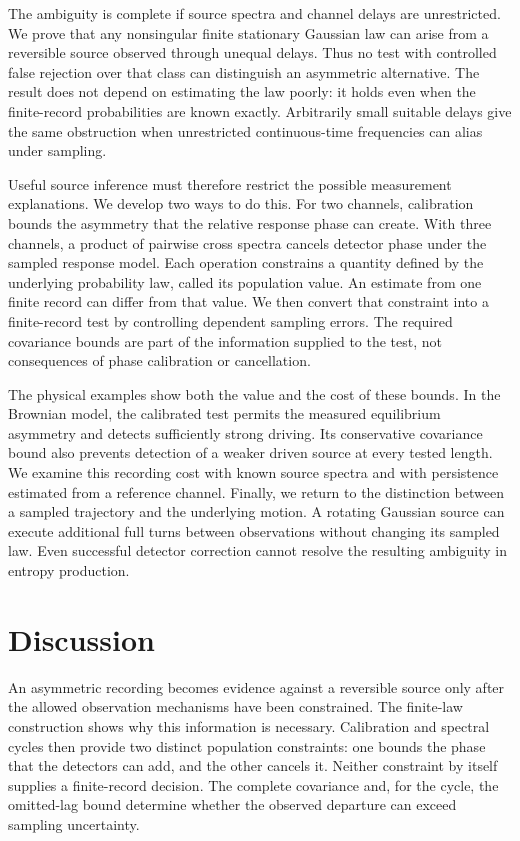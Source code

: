 \documentclass[aps,pre,reprint,floatfix,superscriptaddress,nofootinbib]{revtex4-2}
\begin{document}
The ambiguity is complete if source spectra and channel delays are unrestricted. We prove that any nonsingular finite stationary Gaussian law can arise from a reversible source observed through unequal delays. Thus no test with controlled false rejection over that class can distinguish an asymmetric alternative. The result does not depend on estimating the law poorly: it holds even when the finite-record probabilities are known exactly. Arbitrarily small suitable delays give the same obstruction when unrestricted continuous-time frequencies can alias under sampling.

Useful source inference must therefore restrict the possible measurement explanations. We develop two ways to do this. For two channels, calibration bounds the asymmetry that the relative response phase can create. With three channels, a product of pairwise cross spectra cancels detector phase under the sampled response model. Each operation constrains a quantity defined by the underlying probability law, called its population value. An estimate from one finite record can differ from that value. We then convert that constraint into a finite-record test by controlling dependent sampling errors. The required covariance bounds are part of the information supplied to the test, not consequences of phase calibration or cancellation.

The physical examples show both the value and the cost of these bounds. In the Brownian model, the calibrated test permits the measured equilibrium asymmetry and detects sufficiently strong driving. Its conservative covariance bound also prevents detection of a weaker driven source at every tested length. We examine this recording cost with known source spectra and with persistence estimated from a reference channel. Finally, we return to the distinction between a sampled trajectory and the underlying motion. A rotating Gaussian source can execute additional full turns between observations without changing its sampled law. Even successful detector correction cannot resolve the resulting ambiguity in entropy production.








\section{Discussion}
An asymmetric recording becomes evidence against a reversible source only after the allowed observation mechanisms have been constrained. The finite-law construction shows why this information is necessary. Calibration and spectral cycles then provide two distinct population constraints: one bounds the phase that the detectors can add, and the other cancels it. Neither constraint by itself supplies a finite-record decision. The complete covariance and, for the cycle, the omitted-lag bound determine whether the observed departure can exceed sampling uncertainty.
\end{document}
